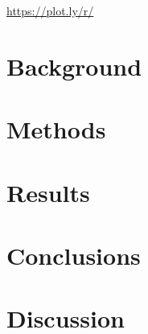 
\url{https://plot.ly/r/}

\section{Background}
\label{sec:5background}

\section{Methods}
\label{sec:5methods}

\section{Results}
\label{sec:5results}

\section{Conclusions}
\label{sec:5conclusions}

\section{Discussion}
\label{sec:5Discussion}

